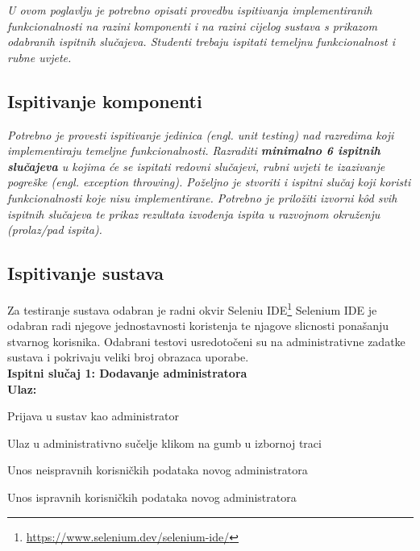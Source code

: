 			 \textit{U ovom poglavlju je potrebno opisati provedbu ispitivanja implementiranih funkcionalnosti na razini komponenti i na razini cijelog sustava s prikazom odabranih ispitnih slučajeva. Studenti trebaju ispitati temeljnu funkcionalnost i rubne uvjete.}
	
			
			\subsection{Ispitivanje komponenti}
			\textit{Potrebno je provesti ispitivanje jedinica (engl. unit testing) nad razredima koji implementiraju temeljne funkcionalnosti. Razraditi \textbf{minimalno 6 ispitnih slučajeva} u kojima će se ispitati redovni slučajevi, rubni uvjeti te izazivanje pogreške (engl. exception throwing). Poželjno je stvoriti i ispitni slučaj koji koristi funkcionalnosti koje nisu implementirane. Potrebno je priložiti izvorni kôd svih ispitnih slučajeva te prikaz rezultata izvođenja ispita u razvojnom okruženju (prolaz/pad ispita). }
			
			
			
			\subsection{Ispitivanje sustava}
			
			Za testiranje sustava odabran je radni okvir Seleniu IDE\footnote{\url{https://www.selenium.dev/selenium-ide/}} Selenium IDE je odabran radi njegove jednostavnosti koristenja te njagove slicnosti ponašanju stvarnog korisnika. Odabrani testovi usredotočeni su na administrativne zadatke sustava i pokrivaju veliki broj obrazaca uporabe.\\ 
			 
			 \textbf{Ispitni slučaj 1: Dodavanje administratora}\\
			 \textbf{Ulaz:}
			 \begin{packed_item}
			 	\item {Prijava u sustav kao administrator}
			 	\item {Ulaz u administrativno sučelje klikom na gumb u izbornoj traci}
			 	\item {Unos neispravnih korisničkih podataka novog administratora}
			 	\item {Unos ispravnih korisničkih podataka novog administratora}
			 \end{packed_item}
			 
